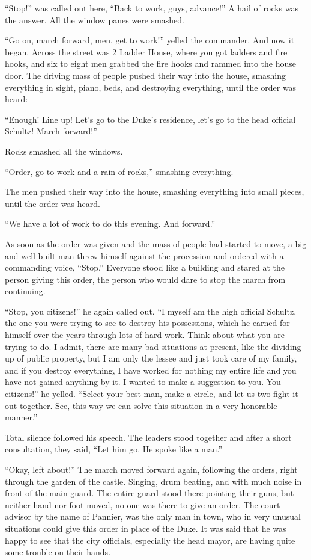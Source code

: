\documentclass{article}
\begin{document}
``Stop!'' was called out here, ``Back to work, guys, advance!'' A hail of rocks was the answer. All the window panes were smashed.

``Go on, march forward, men, get to work!'' yelled the commander. And now it began. Across the street was 2 Ladder House, where you got ladders and fire hooks, and six to eight men grabbed the fire hooks and rammed into the house door. The driving mass of people pushed their way into the house, smashing everything in sight, piano, beds, and destroying everything, until the order was heard:

``Enough! Line up! Let's go to the Duke's residence, let's go to the head official Schultz! March forward!''

Rocks smashed all the windows.

``Order, go to work and a rain of rocks,'' smashing everything.

The men pushed their way into the house, smashing everything into small pieces, until the order was heard.

``We have a lot of work to do this evening. And forward.''

As soon as the order was given and the mass of people had started to move, a big and well-built man threw himself against the procession and ordered with a commanding voice, ``Stop.'' Everyone stood like a building and stared at the person giving this order, the person who would dare to stop the march from continuing.

``Stop, you citizens!'' he again called out. ``I myself am the high official Schultz, the one you were trying to see to destroy his possessions, which he earned for himself over the years through lots of hard work. Think about what you are trying to do. I admit, there are many bad situations at present, like the dividing up of public property, but I am only the lessee and just took care of my family, and if you destroy everything, I have worked for nothing my entire life and you have not gained anything by it. I wanted to make a suggestion to you. You citizens!'' he yelled. ``Select your best man, make a circle, and let us two fight it out together. See, this way we can solve this situation in a very honorable manner.''

Total silence followed his speech. The leaders stood together and after a short consultation, they said, ``Let him go. He spoke like a man.''

``Okay, left about!'' The march moved forward again, following the orders, right through the garden of the castle. Singing, drum beating, and with much noise in front of the main guard. The entire guard stood there pointing their guns, but neither hand nor foot moved, no one was there to give an order. The court advisor by the name of Pannier, was the only man in town, who in very unusual situations could give this order in place of the Duke. It was said that he was happy to see that the city officials, especially the head mayor, are having quite some trouble on their hands.
\end{document}
